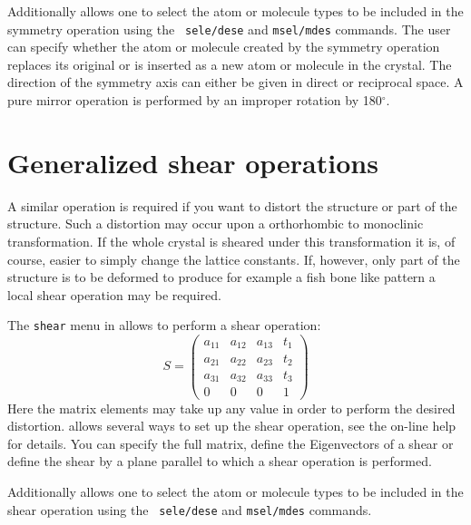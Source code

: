 Additionally \Discus allows one to select the atom or molecule
types to be included in the symmetry operation using the {\tt
sele/dese} and {\tt msel/mdes} commands.  The user can specify
whether the atom or molecule created by the symmetry operation
replaces its original or is inserted as a new atom or molecule in
the crystal. The direction of the symmetry axis can either be given
in direct or reciprocal space.  A pure mirror operation is performed
by an improper rotation by 180$^{\circ}$.\par


\section{Generalized shear operations \label{cryst-shear}}

A similar operation is required if you want to distort the structure
or part of the structure. Such a distortion may occur upon a 
orthorhombic to monoclinic transformation. If the whole crystal is
sheared under this transformation it is, of course, easier to simply
change the lattice constants. If, however, only part of the structure
is to be deformed to produce for example a fish bone like pattern
a local shear operation may be required.

The {\tt shear} menu in \Discus allows to perform a shear operation:
%
\begin{equation}
    S = \left (
        \begin{array}{cccc}
                a_{11} & a_{12} & a_{13} & t_{1}  \\
                a_{21} & a_{22} & a_{23} & t_{2}  \\
                a_{31} & a_{32} & a_{33} & t_{3}  \\
                0 & 0 & 0 & 1
        \end{array} \right )
        \label{cry-eq2}
\end{equation}
%
Here the matrix elements may take up any value in order to perform the
desired distortion. \Discus allows several ways to set up the shear
operation, see the on-line help for details. You can specify the full
matrix, define the Eigenvectors of a shear or define the shear by 
a plane parallel to which a shear operation is performed.

Additionally \Discus allows one to select the atom or molecule
types to be included in the shear operation using the {\tt
sele/dese} and {\tt msel/mdes} commands.

